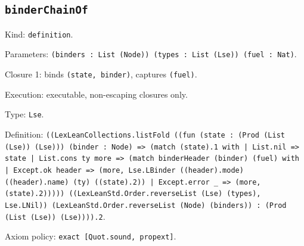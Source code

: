 \documentclass[11pt]{article}
\begin{document}
\subsection*{\texttt{binderChainOf}}
\noindent Kind: \texttt{definition}.\par
\noindent Parameters: \texttt{(binders : List (Node)) (types : List (Lse)) (fuel : Nat)}.\par
\noindent Closure 1: binds \texttt{(state, binder)}, captures \texttt{(fuel)}.\par
\noindent Execution: executable, non-escaping closures only.\par
\noindent Type: \texttt{Lse}.\par
\noindent Definition: \texttt{((LexLeanCollections.listFold ((fun (state : (Prod (List (Lse)) (Lse))) (binder : Node) => (match (state).1 with | List.nil => state | List.cons ty more => (match binderHeader (binder) (fuel) with | Except.ok header => (more, Lse.LBinder ((header).mode) ((header).name) (ty) ((state).2)) | Except.error \_ => (more, (state).2))))) ((LexLeanStd.Order.reverseList (Lse) (types), Lse.LNil)) (LexLeanStd.Order.reverseList (Node) (binders)) : (Prod (List (Lse)) (Lse)))).2}.\par
\noindent Axiom policy: \texttt{exact [Quot.sound, propext]}.\par
\end{document}
